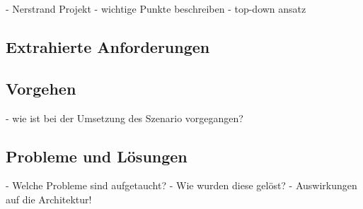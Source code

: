   - Nerstrand Projekt
  - wichtige Punkte beschreiben
  - top-down ansatz

\subsection{Extrahierte Anforderungen} %
\label{sub:extrahierte_anforderungen}


\subsection{Vorgehen} %
\label{sub:vorgehen_szenario}

  - wie ist bei der Umsetzung des Szenario vorgegangen?


\subsection{Probleme und Lösungen} %
\label{sub:probleme_und_loesungen_szenario}

  - Welche Probleme sind aufgetaucht?
  - Wie wurden diese gelöst?
  - Auswirkungen auf die Architektur!



